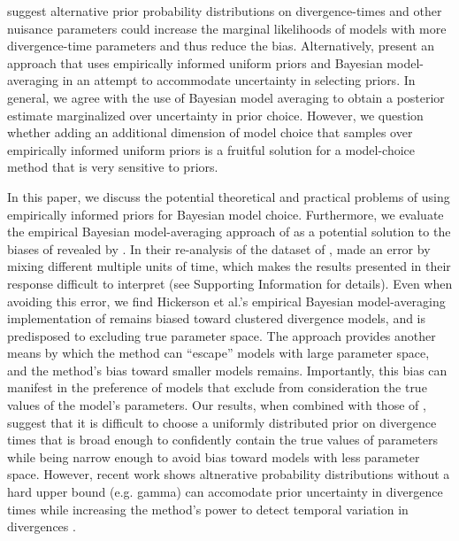 \documentclass[letterpaper,12pt]{article}
\begin{document}
\begin{linenumbers}

\citet{Oaks2012} suggest alternative prior probability distributions on
divergence-times and other nuisance parameters could increase the marginal
likelihoods of models with more divergence-time parameters and thus reduce the
bias.
Alternatively, \citet{Hickerson2013} present an approach that uses empirically
informed uniform priors and Bayesian model-averaging in an attempt to accommodate
uncertainty in selecting priors.
In general, we agree with the use of Bayesian model averaging to obtain a
posterior estimate marginalized over uncertainty in prior choice.
However, we question whether adding an additional dimension of model choice
that samples over empirically informed uniform priors is a fruitful solution
for a model-choice method that is very sensitive to priors.

In this paper, we discuss the potential theoretical and practical problems of
using empirically informed priors for Bayesian model choice.
Furthermore, we evaluate the empirical Bayesian model-averaging approach of
\citet{Hickerson2013} as a potential solution to the biases of \msb revealed by
\citet{Oaks2012}.
In their re-analysis of the dataset of \citet{Oaks2012}, \citet{Hickerson2013}
made an error by mixing different multiple units of time, which makes the
results presented in their response difficult to interpret (see Supporting
Information for details).
Even when avoiding this error, we find Hickerson et al.'s
\citeyear{Hickerson2013} empirical Bayesian model-averaging implementation of
\msb remains biased toward clustered divergence models, and is predisposed to
excluding true parameter space.
The approach provides another means by which the method can ``escape'' models
with large parameter space, and the method's bias toward smaller models
remains.
Importantly, this bias can manifest in the preference of models that exclude
from consideration the true values of the model's parameters.
Our results, when combined with those of \citet{Oaks2012}, suggest that it is
difficult to choose a uniformly distributed prior on divergence times that is
broad enough to confidently contain the true values of parameters while being
narrow enough to avoid bias toward models with less parameter space.
However, recent work shows altnerative probability distributions without a
hard upper bound (e.g. gamma) can accomodate prior uncertainty in divergence
times while increasing the method's power to detect temporal variation in
divergences
\citet{Oaks2014dpp}.


\end{linenumbers}
\end{document}
